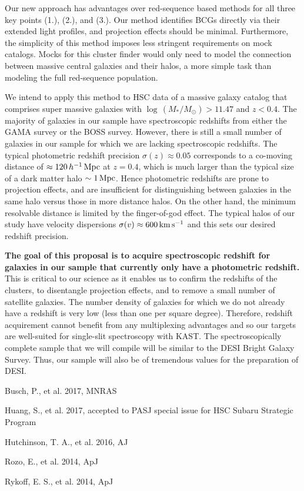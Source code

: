 \documentclass[letterpaper,12pt]{article}
\newenvironment{my_itemize}{
\begin{itemize}
  \setlength{\itemsep}{1pt}
  \setlength{\parskip}{0pt}
  \setlength{\parsep}{0pt}}{\end{itemize}
}
\begin{document}
Our new approach has advantages over red-sequence based methods for all three key points (1.), (2.), and (3.). Our
method identifies BCGs directly via their extended light profiles, and projection effects should be minimal.
Furthermore, the simplicity of this method imposes less stringent requirements on mock catalogs. Mocks for this cluster
finder would only need to model the connection between massive central galaxies and their halos, a more simple task
than modeling the full red-sequence population.

We intend to apply this method to HSC data of a massive galaxy catalog that comprises super massive galaxies with
$\log\,(M_*/M_\odot)>11.47$ and $z<0.4$. The majority of galaxies in our sample have spectroscopic redshifts from
either the GAMA survey or the BOSS survey. However, there is still a small number of galaxies in our sample for which
we are lacking spectroscopic redshifts. The typical photometric redshift precision $\sigma(z)\approx0.05$ corresponds
to a co-moving distance of $\approx120\,h^{-1}\,{\rm Mpc}$ at $z=0.4$, which is much larger than the typical size of a
dark matter halo $\sim1\,{\rm Mpc}$. Hence photometric redshifts are prone to projection effects, and are insufficient
for distinguishing between galaxies in the same halo versus those in more distance halos. On the other hand, the
minimum resolvable distance is limited by the finger-of-god effect. The typical halos of our study have velocity
dispersions $\sigma(v)\approx600\,{\rm km\,s^{-1}}$ and this sets our desired redshift precision.

\textbf{The goal of this proposal is to acquire spectroscopic redshift for galaxies in
our sample that currently only have a photometric redshift.} This is critical to our science as it enables
us to confirm the redshifts of the clusters, to disentangle projection effects, and to remove a small number of
satellite galaxies. The number density of galaxies for which we do not already have a redshift is very low (less than
one per square degree). Therefore, redshift acquirement cannot benefit from any multiplexing advantages and so our
targets are well-suited for single-slit spectroscopy with KAST. The spectroscopically complete sample that we will
compile will be similar to the DESI Bright Galaxy Survey. Thus, our sample will also be of tremendous values for the
preparation of DESI.

\clearpage

\begin{my_itemize}
\item Busch, P., et al. 2017, MNRAS
\item Huang, S., et al. 2017, accepted to PASJ special issue for HSC Subaru Strategic Program
\item Hutchinson, T. A., et al. 2016, AJ
\item Rozo, E., et al. 2014, ApJ
\item Rykoff, E. S., et al. 2014, ApJ
\end{my_itemize}
\end{document}
